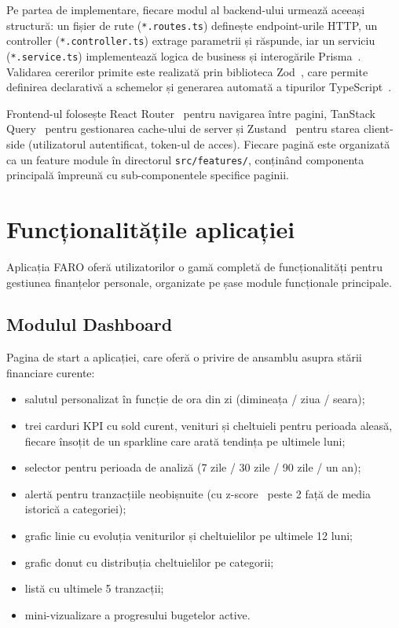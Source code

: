 \documentclass[12pt,a4paper,oneside]{report}
\begin{document}
Pe partea de implementare, fiecare modul al backend-ului urmează aceeași structură: un fișier de rute (\texttt{*.routes.ts}) definește endpoint-urile HTTP, un controller (\texttt{*.controller.ts}) extrage parametrii și răspunde, iar un serviciu (\texttt{*.service.ts}) implementează logica de business și interogările Prisma~\cite{ref:prisma}. Validarea cererilor primite este realizată prin biblioteca Zod~\cite{ref:zod}, care permite definirea declarativă a schemelor și generarea automată a tipurilor TypeScript~\cite{ref:typescript}.

Frontend-ul folosește React Router~\cite{ref:reactrouter} pentru navigarea între pagini, TanStack Query~\cite{ref:tanstack} pentru gestionarea cache-ului de server și Zustand~\cite{ref:zustand} pentru starea client-side (utilizatorul autentificat, token-ul de acces). Fiecare pagină este organizată ca un feature module în directorul \texttt{src/features/}, conținând componenta principală împreună cu sub-componentele specifice paginii.

\section{Funcționalitățile aplicației}

Aplicația FARO oferă utilizatorilor o gamă completă de funcționalități pentru gestiunea finanțelor personale, organizate pe șase module funcționale principale.

\subsection*{Modulul Dashboard}

Pagina de start a aplicației, care oferă o privire de ansamblu asupra stării financiare curente:

\begin{itemize}[leftmargin=2cm,itemsep=2pt]
  \item salutul personalizat în funcție de ora din zi (dimineața / ziua / seara);
  \item trei carduri KPI cu sold curent, venituri și cheltuieli pentru perioada aleasă, fiecare însoțit de un sparkline care arată tendința pe ultimele luni;
  \item selector pentru perioada de analiză (7 zile / 30 zile / 90 zile / un an);
  \item alertă pentru tranzacțiile neobișnuite (cu z-score~\cite{ref:zscore} peste 2 față de media istorică a categoriei);
  \item grafic linie cu evoluția veniturilor și cheltuielilor pe ultimele 12 luni;
  \item grafic donut cu distribuția cheltuielilor pe categorii;
  \item listă cu ultimele 5 tranzacții;
  \item mini-vizualizare a progresului bugetelor active.
\end{itemize}
\end{document}
